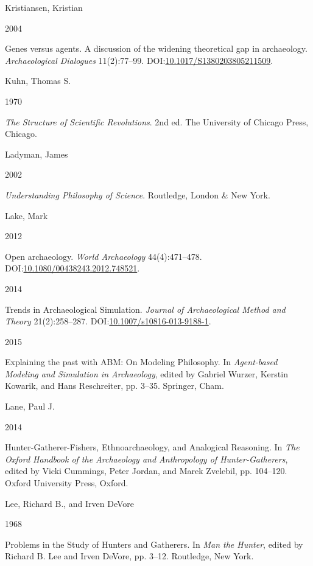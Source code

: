 \documentclass[
  12pt,
  a4paper,
  oneside]{book}
\newlength{\cslhangindent}
\newlength{\csllabelwidth}
\newlength{\cslentryspacingunit} %
\newenvironment{CSLReferences}[2] %
 {%
  \setlength{\parindent}{0pt}
  \ifodd #1
  \let\oldpar\par
  \def\par{\hangindent=\cslhangindent\oldpar}
  \fi
  \setlength{\parskip}{#2\cslentryspacingunit}
 }%
 {}
\newcommand{\CSLBlock}[1]{#1\hfill\break}
\newcommand{\CSLLeftMargin}[1]{\parbox[t]{\csllabelwidth}{#1}}
\newcommand{\CSLRightInline}[1]{\parbox[t]{\linewidth - \csllabelwidth}{#1}\break}
\begin{document}
\begin{CSLReferences}{0}{0}
\leavevmode{}%
\CSLBlock{Kristiansen, Kristian}
\CSLLeftMargin{ 2004}%
\CSLRightInline{{Genes versus agents. A discussion of the widening theoretical gap in archaeology}. \emph{Archaeological Dialogues} 11(2):77--99. DOI:\href{https://doi.org/10.1017/S1380203805211509}{10.1017/S1380203805211509}.}

\leavevmode{}%
\CSLBlock{Kuhn, Thomas S.}
\CSLLeftMargin{ 1970}%
\CSLRightInline{\emph{{The Structure of Scientific Revolutions}}. 2nd ed. The University of Chicago Press, Chicago.}

\leavevmode{}%
\CSLBlock{Ladyman, James}
\CSLLeftMargin{ 2002}%
\CSLRightInline{\emph{{Understanding Philosophy of Science}}. Routledge, London \& New York.}

\leavevmode{}%
\CSLBlock{Lake, Mark}
\CSLLeftMargin{ 2012}%
\CSLRightInline{{Open archaeology}. \emph{World Archaeology} 44(4):471--478. DOI:\href{https://doi.org/10.1080/00438243.2012.748521}{10.1080/00438243.2012.748521}.}

\leavevmode{}%
\CSLLeftMargin{ 2014 }%
\CSLRightInline{{Trends in Archaeological Simulation}. \emph{Journal of Archaeological Method and Theory} 21(2):258--287. DOI:\href{https://doi.org/10.1007/s10816-013-9188-1}{10.1007/s10816-013-9188-1}.}

\leavevmode{}%
\CSLLeftMargin{ 2015 }%
\CSLRightInline{{Explaining the past with ABM: On Modeling Philosophy}. In \emph{{Agent-based Modeling and Simulation in Archaeology}}, edited by Gabriel Wurzer, Kerstin Kowarik, and Hans Reschreiter, pp. 3--35. Springer, Cham.}

\leavevmode{}%
\CSLBlock{Lane, Paul J.}
\CSLLeftMargin{ 2014}%
\CSLRightInline{{Hunter-Gatherer-Fishers, Ethnoarchaeology, and Analogical Reasoning}. In \emph{{The Oxford Handbook of the Archaeology and Anthropology of Hunter-Gatherers}}, edited by Vicki Cummings, Peter Jordan, and Marek Zvelebil, pp. 104--120. Oxford University Press, Oxford.}

\leavevmode{}%
\CSLBlock{Lee, Richard B., and Irven DeVore}
\CSLLeftMargin{ 1968}%
\CSLRightInline{{Problems in the Study of Hunters and Gatherers}. In \emph{{Man the Hunter}}, edited by Richard B. Lee and Irven DeVore, pp. 3--12. Routledge, New York.}


\end{CSLReferences}
\end{document}

